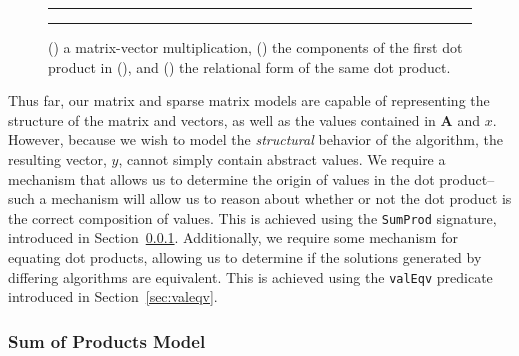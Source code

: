 \documentclass[sigconf]{acmart}
\begin{document}
\begin{figure}
\begin{subfigure}[b]{0.5\textwidth}
  \centering
  
  \caption{}
  \label{fig:mvm}
\end{subfigure}
{\color{lightgray}\rule{0.4\textwidth}{0.1pt}}
\par\bigskip
\begin{subfigure}[b]{0.5\textwidth}
  \centering
  
  \caption{}
  \label{fig:dp}
\end{subfigure}
{\color{lightgray}\rule{0.4\textwidth}{0.1pt}}
\par\bigskip
\begin{subfigure}[b]{0.5\textwidth}
  \centering
  
  \caption{}
  \label{fig:dpt}
\end{subfigure}
\caption{() a matrix-vector multiplication, () the components of the first dot product in (), and () the relational form of the same dot product.}
\end{figure}

Thus far, our matrix and sparse matrix models are capable of representing the structure of the matrix and vectors, as well as the values contained in $\bm{A}$ and $x$.  However, because we wish to model the \emph{structural} behavior of the algorithm, the resulting vector, $y$, cannot simply contain abstract values.  
We require a mechanism that allows us to determine the origin of values in the dot product--such a mechanism will allow us to reason about whether or not the dot product is the correct composition of values.
This is achieved using the \texttt{SumProd} signature, introduced in Section~\ref{sec:sumprod}.  Additionally, we require some mechanism for equating dot products, allowing us to determine if the solutions generated by differing algorithms are equivalent.  This is achieved using the \texttt{valEqv} predicate introduced in Section~\ref{sec:valeqv}.

\subsubsection{Sum of Products Model}
\label{sec:sumprod}
\end{document}
